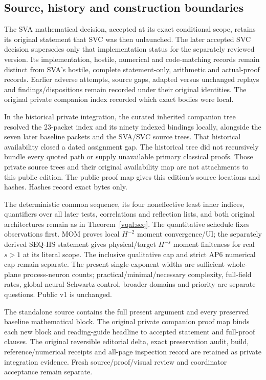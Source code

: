 \documentclass[11pt]{article}
\theoremstyle{plain}
\theoremstyle{definition}
\theoremstyle{remark}
\begin{document}
\subsection{Source, history and construction boundaries}
\label{sva:boundaries}

The SVA mathematical decision, accepted at its exact conditional scope,
retains its original statement that SVC was then unlaunched. The later
accepted SVC decision supersedes only that implementation status for the
separately reviewed version. Its implementation, hostile, numerical and
code-matching records remain distinct from SVA's hostile, complete statement-only,
arithmetic and actual-proof records.
Earlier adverse attempts, source gaps, adapted versus unchanged replays
and findings/dispositions remain recorded under their original identities.
The original private companion index recorded which exact bodies were local.

In the historical private integration, the curated inherited companion
tree resolved the 23-packet index and its ninety indexed bindings locally,
alongside the seven later baseline packets and the SVA/SVC source trees.
That historical availability closed a dated assignment gap. The historical
tree did not recursively bundle every quoted path or supply unavailable
primary classical proofs. Those private source trees and their original
availability map are not attachments to this public edition. The public
proof map gives this edition's source locations and hashes. Hashes record
exact bytes only.

The deterministic common sequence, its four noneffective least inner
indices, quantifiers over all later tests, correlations and reflection
lists, and both
original architectures remain as in Theorem~\ref{vqal:seq}.
The quantitative schedule fixes observations first. MOM proves local
$H^{-2}$ moment convergence/UI; the separately derived SEQ-HS statement
gives physical/target $H^{-s}$ moment finiteness for real $s>1$ at its
literal scope. The inclusive qualitative cap and strict AP6 numerical
cap remain separate. The present single-exponent widths are sufficient
whole-plane process-neuron counts; practical/minimal/necessary complexity,
full-field rates, global neural Schwartz control, broader domains and
priority are separate questions. Public v1 is unchanged.

The standalone source contains the full present argument and every
preserved baseline mathematical block. The original private companion proof map binds each
new block and reading-guide headline to accepted statement and full-proof
clauses. The original reversible editorial delta, exact preservation audit,
build, reference/numerical receipts and all-page inspection record are
retained as private integration evidence. Fresh source/proof/visual review and coordinator
acceptance remain separate.
\end{document}
